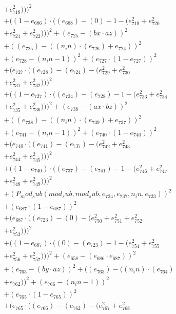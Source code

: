 \documentclass[10pt, a4paper]{article}
\begin{document}
\begin{align*}
& + e_{718}^{2})))^{2} \\
& + ((1 - e_{686})  \cdot  ((e_{688}) - (0) - 1 - (e_{719}^{2} + e_{720}^{2} \\
& + e_{721}^{2} + e_{722}^{2})))^{2} + (e_{725} - (bx  \cdot  az))^{2} \\
& + ((e_{725}) - ((n_in)  \cdot  (e_{726}) + e_{724}))^{2} \\
& + (e_{728} - (n_in - 1))^{2} + (e_{727}  \cdot  (1 - e_{727}))^{2} \\
& + (e_{727}  \cdot  ((e_{728}) - (e_{724}) - (e_{729}^{2} + e_{730}^{2} \\
& + e_{731}^{2} + e_{732}^{2})))^{2} \\
& + ((1 - e_{727})  \cdot  ((e_{724}) - (e_{728}) - 1 - (e_{733}^{2} + e_{734}^{2} \\
& + e_{735}^{2} + e_{736}^{2})))^{2} + (e_{738} - (ax  \cdot  bz))^{2} \\
& + ((e_{738}) - ((n_in)  \cdot  (e_{739}) + e_{737}))^{2} \\
& + (e_{741} - (n_in - 1))^{2} + (e_{740}  \cdot  (1 - e_{740}))^{2} \\
& + (e_{740}  \cdot  ((e_{741}) - (e_{737}) - (e_{742}^{2} + e_{743}^{2} \\
& + e_{744}^{2} + e_{745}^{2})))^{2} \\
& + ((1 - e_{740})  \cdot  ((e_{737}) - (e_{741}) - 1 - (e_{746}^{2} + e_{747}^{2} \\
& + e_{748}^{2} + e_{749}^{2})))^{2} \\
& + (P_mod_sub(mod_sub, mod_sub, e_{724}, e_{737}, n_in, e_{723}))^{2} \\
& + (e_{687}  \cdot  (1 - e_{687}))^{2} \\
& + (e_{687}  \cdot  ((e_{723}) - (0) - (e_{750}^{2} + e_{751}^{2} + e_{752}^{2} \\
& + e_{753}^{2})))^{2} \\
& + ((1 - e_{687})  \cdot  ((0) - (e_{723}) - 1 - (e_{754}^{2} + e_{755}^{2} \\
& + e_{756}^{2} + e_{757}^{2})))^{2} + (e_{658} - (e_{686}  \cdot  e_{687}))^{2} \\
& + (e_{763} - (by  \cdot  az))^{2} + ((e_{763}) - ((n_in)  \cdot  (e_{764}) \\
& + e_{762}))^{2} + (e_{766} - (n_in - 1))^{2} \\
& + (e_{765}  \cdot  (1 - e_{765}))^{2} \\
& + (e_{765}  \cdot  ((e_{766}) - (e_{762}) - (e_{767}^{2} + e_{768}^{2} \\

\end{align*}
\end{document}
